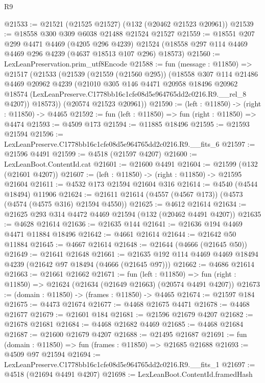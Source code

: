 \begin{lexlean}{R9}
\begin{coremodule}
@21533 := @21521 (@21525 @21527) (@132 (@20462 @21523 @20961))
@21539 := @18558 @300 @309 @6038 @21488 @21524 @21527
@21559 := @18551
    @207
    @299
    @4471
    @4469
    (@4205 @296 @4239)
    @21524
    (@18558 @297 @114 @4469 @4469 @296 @4239 (@4637 @18513 @107 @296) @18573)
@21560 := LexLeanPreservation.prim_utf8Encode
@21588 := fun (message : @11850) =>
  @21517
    (@21533
      (@21539
        (@21559 (@21560 @295))
        (@18558
          @307
          @114
          @21486
          @4469
          @20962
          @4239
          (@21010
            @305
            @146
            @4471
            @20958
            @18496
            @20962
            @18574
            (LexLeanPreserve.C1778bb16c1cfe08d5e964765dd2c0216.R9.__rel_8 @4207))
          @18573))
      (@20574 @21523 @20961))
@21590 := (left : @11850) -> (right : @11850) -> @4465
@21592 := fun (left : @11850) => fun (right : @11850) => @4474
@21593 := @4509 @173
@21594 := @11885 @18496
@21595 := @21593 @21594
@21596 := LexLeanPreserve.C1778bb16c1cfe08d5e964765dd2c0216.R9.__fits_6
@21597 := @21596 @4491
@21599 := @4518 (@21597 @4207)
@21600 := LexLeanBoot.ContentId.cat
@21601 := @21600 @4491
@21604 := @21599 (@132 (@21601 @4207))
@21607 := (left : @11850) -> (right : @11850) -> @21595 @21604
@21611 := @4532 @173 @21594 @21604 @316
@21614 := @4540 (@4544 @18494) @11906
@21624 := @21611 @21614 (@4557 (@4567 @173)) (@4573 (@4574 (@4575 @316) @21594 @4550))
@21625 := @4612 @21614
@21634 := @21625 @293 @314 @4472 @4469 @21594 (@132 (@20462 @4491 @4207))
@21635 := @4628 @21614
@21636 := @21635 @144
@21641 := @21636 @194 @4469 @4471 @11884 @18496
@21642 := @4661 @21614
@21644 := @21642 @50 @11884
@21645 := @4667 @21614
@21648 := @21644 (@4666 (@21645 @50))
@21649 := @21641 @21648
@21661 := @21635 @192 @114 @4469 @4469 @18494 @4239 (@21642 @97 @18494 (@4666 (@21645 @97)))
@21662 := @4686 @21614
@21663 := @21661 @21662
@21671 := fun (left : @11850) =>
  fun (right : @11850) => @21624 (@21634 (@21649 @21663) (@20574 @4491 @4207))
@21673 := (domain : @11850) -> (frames : @11850) -> @4465
@21674 := @21597 @184
@21675 := @4473 @21674
@21677 := @4468 @21675 @4471
@21678 := @4468 @21677
@21679 := @21601 @184
@21681 := @21596 @21679 @4207
@21682 := @21678 @21681
@21684 := @4468 @21682 @4469
@21685 := @4468 @21684
@21687 := @21600 @21679 @4207
@21688 := @21495 @21687
@21691 := fun (domain : @11850) => fun (frames : @11850) => @21685 @21688
@21693 := @4509 @97 @21594
@21694 := LexLeanPreserve.C1778bb16c1cfe08d5e964765dd2c0216.R9.__fits_1
@21697 := @4518 (@21694 @4491 @4207)
@21698 := LexLeanBoot.ContentId.framedHash

\end{coremodule}
\end{lexlean}
